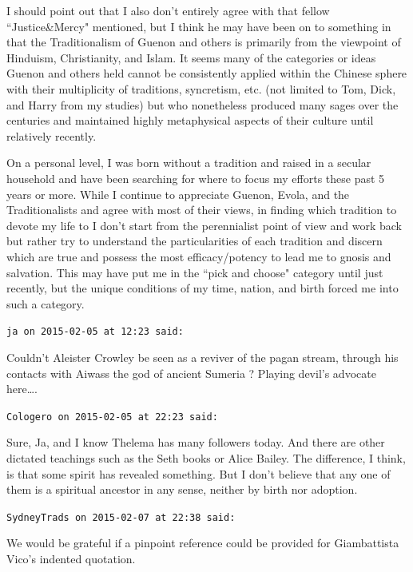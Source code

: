 \begin{footnotesize}
\begin{sffamily}
I should point out that I also don't entirely agree with that fellow ``Justice\&Mercy" mentioned, but I think he may have been on to something in that the Traditionalism of Guenon and others is primarily from the viewpoint of Hinduism, Christianity, and Islam. It seems many of the categories or ideas Guenon and others held cannot be consistently applied within the Chinese sphere with their multiplicity of traditions, syncretism, etc. (not limited to Tom, Dick, and Harry from my studies) but who nonetheless produced many sages over the centuries and maintained highly metaphysical aspects of their culture until relatively recently.

On a personal level, I was born without a tradition and raised in a secular household and have been searching for where to focus my efforts these past 5 years or more. While I continue to appreciate Guenon, Evola, and the Traditionalists and agree with most of their views, in finding which tradition to devote my life to I don't start from the perennialist point of view and work back but rather try to understand the particularities of each tradition and discern which are true and possess the most efficacy/potency to lead me to gnosis and salvation. This may have put me in the ``pick and choose" category until just recently, but the unique conditions of my time, nation, and birth forced me into such a category.


\hfill

\texttt{ja on 2015-02-05 at 12:23 said: }

Couldn't Aleister Crowley be seen as a reviver of the pagan stream, through his contacts with Aiwass the god of ancient Sumeria ? Playing devil's advocate here….


\hfill

\texttt{Cologero on 2015-02-05 at 22:23 said: }

Sure, Ja, and I know Thelema has many followers today. And there are other dictated teachings such as the Seth books or Alice Bailey. The difference, I think, is that some spirit has revealed something. But I don't believe that any one of them is a spiritual ancestor in any sense, neither by birth nor adoption.


\hfill

\texttt{SydneyTrads on 2015-02-07 at 22:38 said: }

We would be grateful if a pinpoint reference could be provided for Giambattista Vico's indented quotation.


\hfill


\end{sffamily}
\end{footnotesize}
